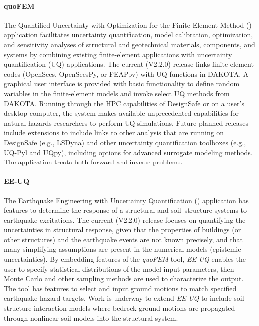 \paragraph{quoFEM}  The Quantified Uncertainty with Optimization for the Finite-Element Method () application facilitates uncertainty quantification, model calibration, optimization, and sensitivity analyses of structural and geotechnical materials, components, and systems by combining existing finite-element applications with uncertainty quantification (UQ) applications. The current (V2.2.0) release links finite-element codes (OpenSees, OpenSeesPy, or FEAPpv) with UQ functions in DAKOTA. A graphical user interface is provided with basic functionality to define random variables in the finite-element models and invoke select UQ methods from DAKOTA. Running through the HPC capabilities of DesignSafe or on a user’s desktop computer, the system makes available unprecedented capabilities for natural hazards researchers to perform UQ simulations. Future planned releases include extensions to include links to other analysis that are running on DesignSafe (e.g., LSDyna) and other uncertainty quantification toolboxes (e.g., UQ-Pyl and UQpy), including options for advanced surrogate modeling methods. The application treats both forward and inverse problems.

\paragraph{EE-UQ} The Earthquake Engineering with Uncertainty Quantification () application has features to determine the response of a structural and soil--structure systems to earthquake excitations. The current (V2.2.0) release focuses on quantifying the uncertainties in structural response, given that the properties of buildings (or other structures) and the earthquake events are not known precisely, and that many simplifying assumptions are present in the numerical models (epistemic uncertainties).  By embedding features of the \emph{quoFEM} tool, \emph{EE-UQ} enables the user to specify statistical distributions of the model input parameters, then Monte Carlo and other sampling methods are used to characterize the output. The tool has features to select and input ground motions to match specified earthquake hazard targets. Work is underway to extend \emph{EE-UQ} to include soil--structure interaction models where bedrock ground motions are propagated through nonlinear soil models into the structural system.

